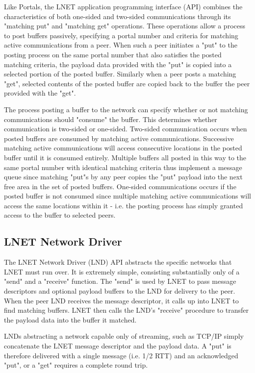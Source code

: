 \documentclass[]{sigplan-proc}
\begin{document}
Like Portals, the LNET application programming interface (API) combines the characteristics of both one-sided
and two-sided communications through its "matching put" and "matching get" operations.  These operations allow
a process to post buffers passively, specifying a portal number and criteria for matching active
communications from a peer.  When such a peer initiates a "put" to the posting process on the same portal
number that also satisfies the posted matching criteria, the payload data provided with the "put" is copied
into a selected portion of the posted buffer.  Similarly when a peer posts a matching "get", selected contents
of the posted buffer are copied back to the buffer the peer provided with the "get".

The process posting a buffer to the network can specify whether or not matching communications should
"consume" the buffer.  This determines whether communication is two-sided or one-sided.  Two-sided
communication occurs when posted buffers are consumed by matching active communications.  Successive matching
active communications will access consecutive locations in the posted buffer until it is consumed entirely.
Multiple buffers all posted in this way to the same portal number with identical matching criteria thus
implement a message queue since matching "put"s by any peer copies the "put" payload into the next free area
in the set of posted buffers.  One-sided communications occurs if the posted buffer is not consumed since
multiple matching active communications will access the same locations within it - i.e. the posting process
has simply granted access to the buffer to selected peers.

\subsection{LNET Network Driver}

The LNET Network Driver (LND) API abstracts the specific networks that LNET must run over.  It is extremely
simple, consisting substantially only of a "send" and a "receive" function.  The "send" is used by LNET to
pass message descriptors and optional payload buffers to the LND for delivery to the peer.  When the peer LND
receives the message descriptor, it calls up into LNET to find matching buffers.  LNET then calls the LND's
"receive" procedure to transfer the payload data into the buffer it matched.

LNDs abstracting a network capable only of streaming, such as TCP/IP simply concatenate the LNET message
descriptor and the payload data.  A "put" is therefore delivered with a single message (i.e. 1/2 RTT) and an acknowledged "put", or a "get" requires a complete round trip.
\end{document}
